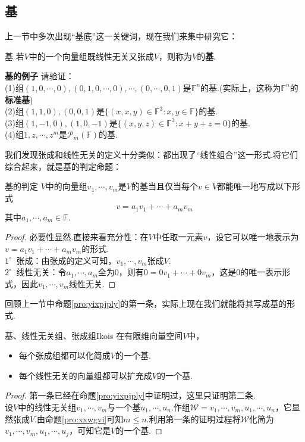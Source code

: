 \documentclass[lang=cn, zihao=5]{elegantbook}
\newcommand{\F}{\mathbb{F}}
\newcommand{\buzhou}[1]{$#1^{\circ} \ $}
\newcommand{\examplefont}[1]{\color{mgreen} \textbf{#1}}
\begin{document}
\subsection{基}

上一节中多次出现“基底”这一关键词，现在我们来集中研究它：

\begin{definition}{基}
	若$V$中的一个向量组既线性无关又张成$V$，则称为$V$的\textbf{基}.
\end{definition}

\begin{example}{\examplefont{基的例子}}
	请验证： \\
	(1)组$(1,0,\cdots ,0),(0,1,0,\cdots ,0), \cdots ,(0,\cdots ,0,1)$是$\F ^{n}$的基.(实际上，这称为$\F ^{n}$的\textbf{标准基}) \\
	(2)组$(1,1,0),(0,0,1)$是$\{ (x,x,y) \in \F ^{3}:x,y \in \F \}$的基. \\
	(3)组$(1,-1,0),(1,0,-1)$是$\{ (x,y,z) \in \F ^{3}:x+y+z=0 \}$的基. \\
	(4)组$1,z, \cdots ,z^{m}$是$\mathcal{P}_m (\F)$的基.
\end{example}

我们发现张成和线性无关的定义十分类似：都出现了“线性组合”这一形式.将它们综合起来，就是基的判定命题：

\begin{proposition}{基的判定}
	$V$中的向量组$v_1, \cdots ,v_m$是$V$的基当且仅当每个$v \in V$都能唯一地写成以下形式$$v = a_1v_1 + \cdots + a_mv_m$$
	其中$a_1, \cdots ,a_m \in \F$.
\end{proposition}
\begin{proof}
	必要性显然.直接来看充分性：在$V$中任取一元素$v$，设它可以唯一地表示为$v = a_1v_1 + \cdots + a_mv_m$的形式. \\
	\buzhou{1} 张成：由张成的定义可知，$v_1, \cdots ,v_m$张成$V$. \\
	\buzhou{2} 线性无关：令$a_1, \cdots , a_m$全为$0$，则有$0=0v_1 + \cdots + 0v_m$，这是$0$的唯一表示形式，因此$v_1, \cdots ,v_m$线性无关.
\end{proof}

回顾上一节中命题\ref{pro:yixpjply}的第一条，实际上现在我们就能将其写成基的形式.

\begin{proposition}{基、线性无关组、张成组I}{kois}
	在有限维向量空间$V$中，
	\begin{itemize}
		\item 每个张成组都可以化简成$V$的一个基.
		\item 每个线性无关的向量组都可以扩充成$V$的一个基.
	\end{itemize}
\end{proposition}
\begin{proof}
	第一条已经在命题\ref{pro:yixpjply}中证明过，这里只证明第二条. \\
	设$V$中的线性无关组$v_1, \cdots ,v_m$与一个基$u_1, \cdots ,u_n$.作组$\mathcal{W} = v_1, \cdots ,v_m,u_1, \cdots ,u_n$，它显然张成$V$.由命题\ref{pro:xxwgvi}可知$m \leq n$.利用第一条的证明过程将$\mathcal{W}$化简为$v_1, \cdots , v_m , u_1, \cdots ,u_j$，可知它是$V$的一个基.
\end{proof}
\end{document}
